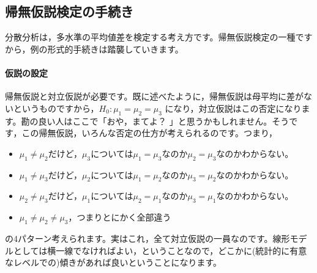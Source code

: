 \documentclass{ltjbook}
\begin{document}



\subsection{帰無仮説検定の手続き}
分散分析は，多水準の平均値差を検定する考え方です。帰無仮説検定の一種ですから，例の形式的手続きは踏襲していきます。
\paragraph{仮説の設定}帰無仮説と対立仮説が必要です。既に述べたように，帰無仮説は母平均に差がないというものですから，$H_0 : \mu_1 = \mu_2 = \mu_3$ になり，対立仮説はこの否定になります。勘の良い人はここで「おや，まてよ？ 」と思うかもしれません。そうです，この帰無仮説，いろんな否定の仕方が考えられるのです。つまり，
\begin{itemize}
    \item $\mu_1 \neq \mu_2$だけど，$\mu_3$については$\mu_1=\mu_3$なのか$\mu_2=\mu_3$なのかわからない。
    \item $\mu_1 \neq \mu_3$だけど，$\mu_2$については$\mu_1=\mu_2$なのか$\mu_3=\mu_2$なのかわからない。
    \item $\mu_2 \neq \mu_3$だけど，$\mu_1$については$\mu_2=\mu_1$なのか$\mu_3=\mu_1$なのかわからない。
    \item $\mu_1 \neq \mu_2 \neq \mu_3$，つまりとにかく全部違う
\end{itemize}
の4パターン考えられます。実はこれ，全て対立仮説の一員なのです。線形モデルとしては横一線でなければよい，ということなので，どこかに(統計的に有意なレベルでの)傾きがあれば良いということになります。
\end{document}
